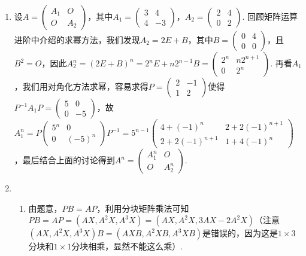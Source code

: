 \begin{enumerate}
    \item 设$A=\begin{pmatrix}
        A_1 & O \\ O & A_2
    \end{pmatrix}$，其中$A_1=\begin{pmatrix}
        3 & 4 \\ 4 & -3
    \end{pmatrix}$，$A_2=\begin{pmatrix}
        2 & 4 \\ 0 & 2
    \end{pmatrix}$. 回顾矩阵运算进阶中介绍的求幂方法，我们发现$A_2=2E+B$，其中$B=\begin{pmatrix}
        0 & 4 \\ 0 & 0
    \end{pmatrix}$，且$B^2=O$，因此$A_2^n=(2E+B)^n=2^nE+n2^{n-1}B=\begin{pmatrix}
        2^n & n2^{n+1} \\ 0 & 2^n
    \end{pmatrix}$. 再看$A_1$，我们用对角化方法求幂，容易求得$P=\begin{pmatrix}
        2 & -1 \\ 1 & 2
    \end{pmatrix}$使得$P^{-1}A_1P=\begin{pmatrix}
        5 & 0 \\ 0 & -5
    \end{pmatrix}$，故$A_1^n=P\begin{pmatrix}
        5^n & 0 \\ 0 & (-5)^n
    \end{pmatrix}P^{-1}=5^{n-1}\begin{pmatrix}
        4+(-1)^n & 2+2(-1)^{n+1} \\ 2+2(-1)^{n+1} & 1+4(-1)^n
    \end{pmatrix}$，最后结合上面的讨论得到$A^n=\begin{pmatrix}
        A_1^n & O \\ O & A_2^n
    \end{pmatrix}$.

    \item \begin{enumerate}
        \item 由题意，$PB=AP$，利用分块矩阵乘法可知$PB=AP=(AX,A^2X,A^3X)=(AX,A^2X,3AX-2A^2X)$（注意$(AX,A^2X,A^3X)B=(AXB,A^2XB,A^3XB)$是错误的，因为这是$1\times 3$分块和$1\times 1$分块相乘，显然不能这么乘）.


\end{enumerate}
\end{enumerate}
